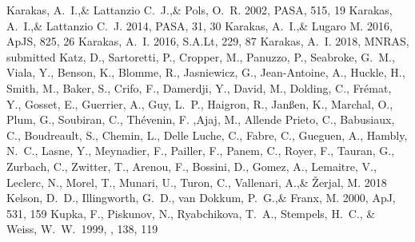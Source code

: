 \documentclass[a4paper,fleqn,usenatbib]{mnras}
\begin{document}
\begin{thebibliography}{99}
Karakas, A.~I.,\& Lattanzio C.~J.,\& Pols, O.~R. 2002, 
PASA, 515, 19
Karakas, A.~I.,\& Lattanzio C.~J. 2014, 
PASA, 31, 30
Karakas, A.~I.,\& Lugaro M. 2016, 
ApJS, 825, 26
Karakas, A.~I. 2016, 
S.A.Lt, 229, 87
Karakas, A.~I. 2018, 
MNRAS, submitted
Katz, D., Sartoretti, P., Cropper, M., Panuzzo, P., Seabroke, G.~M., Viala, Y., Benson, K., Blomme, R., Jasniewicz, G., Jean-Antoine, A., Huckle, H., Smith, M., Baker, S., Crifo, F., Damerdji, Y., David, M., Dolding, C., Fr{\'e}mat, Y., Gosset, E., Guerrier, A., Guy, L.~P., Haigron, R., Jan{\ss}en, K., Marchal, O., Plum, G., Soubiran, C., Th{\'e}venin, F. ,Ajaj, M., Allende Prieto, C., Babusiaux, C., Boudreault, S., Chemin, L., Delle Luche, C., Fabre, C., Gueguen, A., Hambly, N.~C., Lasne, Y., Meynadier, F., Pailler, F., Panem, C., Royer, F., Tauran, G., Zurbach, C., Zwitter, T., Arenou, F., Bossini, D., Gomez, A., Lemaitre, V., Leclerc, N., Morel, T., Munari, U., Turon, C., Vallenari, A.,\& {\v Z}erjal, M. 2018
Kelson, D.~D., Illingworth, G.~D., van Dokkum, P.~G.,\& Franx, M. 2000, ApJ, 531, 159
 Kupka, F., Piskunov, N., Ryabchikova, T.~A., Stempels, H.~C., \& Weiss, W.~W.\ 1999, \aaps, 138, 119 

\end{thebibliography}
\end{document}

